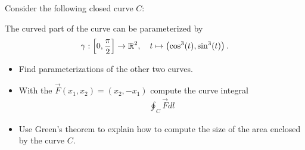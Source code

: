 \documentclass[11pt]{article}
\begin{document}
\begin{exercise}
    Consider the following closed curve $C$:
    \begin{center}
    \end{center}
    The curved part of the curve can be parameterized by 
    \begin{align*}
        \gamma : \left[0,\frac{\pi}{2}\right] \to \mathbb{R}^2, \quad t \mapsto \left( \cos^3(t), \sin^3(t) \right).
    \end{align*}
    \begin{itemize}
        \item Find parameterizations of the other two curves.
        \item With the $\vec F(x_1,x_2) = (x_2,-x_1)$ compute the curve integral 
        \begin{gather*} \oint_C \vec F dl \end{gather*}
        \item Use Green's theorem to explain how to compute the size of the area enclosed by the curve $C$.
    \end{itemize}
\end{exercise}
\end{document}
